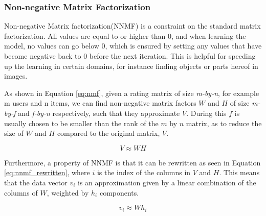 \subsubsection{Non-negative Matrix Factorization}

Non-negative Matrix factorization(NNMF) is a constraint on the standard matrix factorization. All values are equal to or higher than 0, and when learning the model, no values can go below 0, which is ensured by setting any values that have become negative back to 0 before the next iteration. This is helpful for speeding up the learning in certain domains, for instance finding objects or parts hereof in images\cite{nnmf}.

As shown in Equation \ref{eq:nmf}, given a rating matrix of size \textit{m-by-n}, for example m users and n items, we can find non-negative matrix factors $W$ and $H$ of size \textit{m-by-f} and \textit{f-by-n} respectively, such that they approximate $V$. During this $f$ is usually chosen to be smaller than the rank of the $m$ by $n$ matrix, as to reduce the size of $W$ and $H$ compared to the original matrix, $V$\cite{LeeNMF}.

\begin{equation} \label{eq:nmf}
	V \approx W H
\end{equation}

Furthermore, a property of NNMF is that it can be rewritten as seen in Equation \ref{eq:nnmf_rewritten}, where $i$ is the index of the columns in $V$ and $H$. This means that the data vector $v_{i}$ is an approximation given by a linear combination of the columns of $W$, weighted by $h_{i}$ components\cite{LeeNMF}.

\begin{equation} \label{eq:nnmf_rewritten}
	v_{i} \approx W h_{i}
\end{equation}